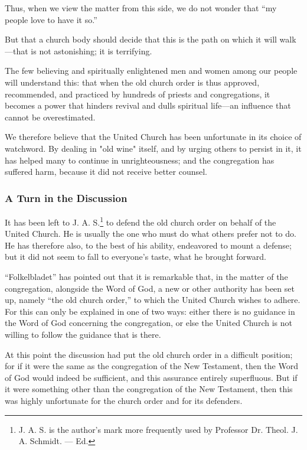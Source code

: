 Thus, when we view the matter from this side, we do not wonder that “my people love to have it so.”

But that a church body should decide that this is the path on which it will walk—that is not astonishing; it is terrifying.

The few believing and spiritually enlightened men and women among our people will understand this: that when the old church order is thus approved, recommended, and practiced by hundreds of priests and congregations, it becomes a power that hinders revival and dulls spiritual life—an influence that cannot be overestimated.

We therefore believe that the United Church has been unfortunate in its choice of watchword. By dealing in "old wine" itself, and by urging others to persist in it, it has helped many to continue in unrighteousness; and the congregation has suffered harm, because it did not receive better counsel.

\subsubsection{A Turn in the Discussion}

It has been left to J. A. S.\footnote{J. A. S. is the author’s mark more frequently used by Professor Dr. Theol. J. A. Schmidt. — Ed.} to defend the old church order on behalf of the United Church. He is usually the one who must do what others prefer not to do. He has therefore also, to the best of his ability, endeavored to mount a defense; but it did not seem to fall to everyone’s taste, what he brought forward.

“Folkelbladet” has pointed out that it is remarkable that, in the matter of the congregation, alongside the Word of God, a new or other authority has been set up, namely “the old church order,” to which the United Church wishes to adhere. For this can only be explained in one of two ways: either there is no guidance in the Word of God concerning the congregation, or else the United Church is not willing to follow the guidance that is there.

At this point the discussion had put the old church order in a difficult position; for if it were the same as the congregation of the New Testament, then the Word of God would indeed be sufficient, and this assurance entirely superfluous. But if it were something other than the congregation of the New Testament, then this was highly unfortunate for the church order and for its defenders.

